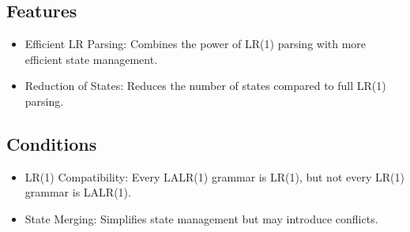 \subsection{Features}
\begin{itemize}
    \item Efficient LR Parsing: Combines the power of LR(1) parsing with more efficient state management.
    \item Reduction of States: Reduces the number of states compared to full LR(1) parsing.
\end{itemize}

\subsection{Conditions}
\begin{itemize}
    \item LR(1) Compatibility: Every LALR(1) grammar is LR(1), but not every LR(1) grammar is LALR(1).
    \item State Merging: Simplifies state management but may introduce conflicts.
\end{itemize}
